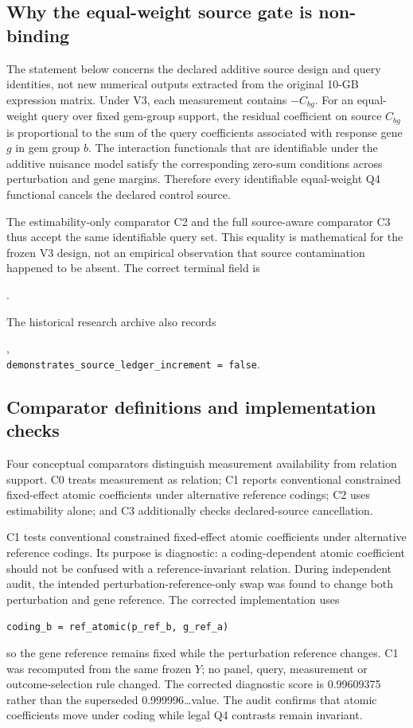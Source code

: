 \documentclass[11pt]{article}
\begin{document}
\subsection{Why the equal-weight source gate is non-binding}
The statement below concerns the declared additive source design and query identities, not new numerical outputs extracted from the original 10-GB expression matrix. Under V3, each measurement contains $-C_{bg}$. For an equal-weight query over fixed gem-group support, the residual coefficient on source $C_{bg}$ is proportional to the sum of the query coefficients associated with response gene $g$ in gem group $b$. The interaction functionals that are identifiable under the additive nuisance model satisfy the corresponding zero-sum conditions across perturbation and gene margins. Therefore every identifiable equal-weight Q4 functional cancels the declared control source.

The estimability-only comparator C2 and the full source-aware comparator C3 thus accept the same identifiable query set. This equality is mathematical for the frozen V3 design, not an empirical observation that source contamination happened to be absent. The correct terminal field is
\begin{center}
\texttt{}.
\end{center}
The historical research archive also records
\begin{center}
\texttt{},\\
\texttt{demonstrates\_source\_ledger\_increment = false}.
\end{center}


\subsection{Comparator definitions and implementation checks}
Four conceptual comparators distinguish measurement availability from relation support. C0 treats measurement as relation; C1 reports conventional constrained fixed-effect atomic coefficients under alternative reference codings; C2 uses estimability alone; and C3 additionally checks declared-source cancellation.

C1 tests conventional constrained fixed-effect atomic coefficients under alternative reference codings. Its purpose is diagnostic: a coding-dependent atomic coefficient should not be confused with a reference-invariant relation. During independent audit, the intended perturbation-reference-only swap was found to change both perturbation and gene reference. The corrected implementation uses
\begin{center}
\texttt{coding\_b = ref\_atomic(p\_ref\_b, g\_ref\_a)}
\end{center}
so the gene reference remains fixed while the perturbation reference changes. C1 was recomputed from the same frozen $Y$; no panel, query, measurement or outcome-selection rule changed. The corrected diagnostic score is 0.99609375 rather than the superseded 0.999996\ldots value. The audit confirms that atomic coefficients move under coding while legal Q4 contrasts remain invariant.
\end{document}
